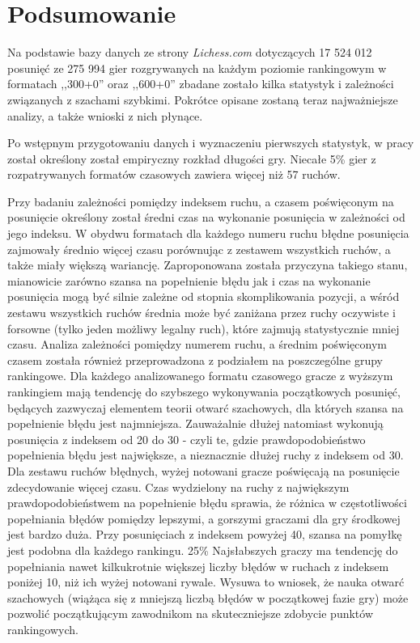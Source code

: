 \documentclass[inzynierska]{pwr_wmat_praca_dyplomowa}
\theoremstyle{plain}
\numberwithin{theorem}{chapter}
\theoremstyle{definition}
\numberwithin{theorem}{chapter}
\begin{document}
\chapter{Podsumowanie}
Na podstawie bazy danych ze strony \textit{Lichess.com} dotyczących 17 524 012 posunięć ze 275 994 gier rozgrywanych na każdym poziomie rankingowym w formatach ,,300+0'' oraz ,,600+0'' zbadane zostało kilka statystyk i zależności związanych z szachami szybkimi. Pokrótce opisane zostaną teraz najważniejsze analizy, a także wnioski z nich płynące.

Po wstępnym przygotowaniu danych i wyznaczeniu pierwszych statystyk, w pracy został określony został empiryczny rozkład długości gry. Niecałe 5\% gier z rozpatrywanych formatów czasowych zawiera więcej niż 57 ruchów. 

Przy badaniu zależności pomiędzy indeksem ruchu, a czasem poświęconym na posunięcie określony został średni czas na wykonanie posunięcia w zależności od jego indeksu. W obydwu formatach dla każdego numeru ruchu błędne posunięcia zajmowały średnio więcej czasu porównując z zestawem wszystkich ruchów, a także miały większą wariancję.
Zaproponowana została przyczyna takiego stanu, mianowicie zarówno szansa na popełnienie błędu jak i czas na wykonanie posunięcia mogą być silnie zależne od stopnia skomplikowania pozycji, a wśród zestawu wszystkich ruchów średnia może być zaniżana przez ruchy oczywiste i forsowne (tylko jeden możliwy legalny ruch), które zajmują statystycznie mniej czasu.
Analiza zależności pomiędzy numerem ruchu, a średnim poświęconym czasem została również przeprowadzona z podziałem na poszczególne grupy rankingowe. Dla każdego analizowanego formatu czasowego gracze z wyższym rankingiem mają tendencję do szybszego wykonywania początkowych posunięć, będących zazwyczaj elementem teorii otwarć szachowych, dla których szansa na popełnienie błędu jest najmniejsza. Zauważalnie dłużej natomiast wykonują posunięcia z indeksem od 20 do 30 - czyli te, gdzie prawdopodobieństwo popełnienia błędu jest największe, a nieznacznie dłużej ruchy z indeksem od 30. Dla zestawu ruchów błędnych, wyżej notowani gracze poświęcają na posunięcie zdecydowanie więcej czasu. Czas wydzielony na ruchy z największym prawdopodobieństwem na popełnienie błędu sprawia, że różnica w częstotliwości popełniania błędów pomiędzy lepszymi, a gorszymi graczami dla gry środkowej jest bardzo duża. Przy posunięciach z indeksem powyżej 40, szansa na pomyłkę jest podobna dla każdego rankingu. 25\% Najsłabszych graczy ma tendencję do popełniania nawet kilkukrotnie większej liczby błędów w ruchach z indeksem poniżej 10, niż ich wyżej notowani rywale. Wysuwa to wniosek, że nauka otwarć szachowych (wiążąca się z mniejszą liczbą błędów w początkowej fazie gry) może pozwolić początkującym zawodnikom na skuteczniejsze zdobycie punktów rankingowych.
\end{document}
